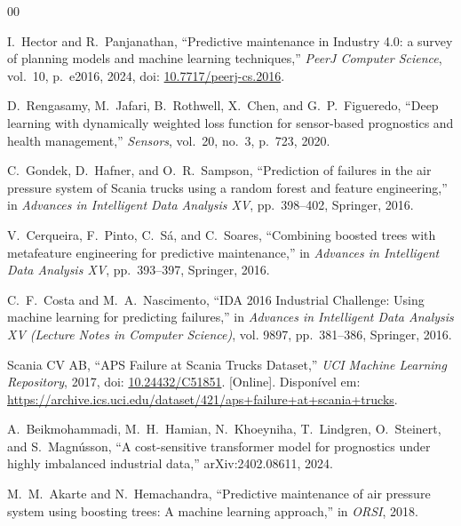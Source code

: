 \documentclass[conference]{IEEEtran}
\begin{document}
\begin{thebibliography}{00}

I.~Hector and R.~Panjanathan, ``Predictive maintenance in Industry 4.0: a survey of planning models and machine learning techniques,'' \emph{PeerJ Computer Science}, vol.~10, p.~e2016, 2024, doi: \href{https://doi.org/10.7717/peerj-cs.2016}{10.7717/peerj-cs.2016}.

D.~Rengasamy, M.~Jafari, B.~Rothwell, X.~Chen, and G.~P.~Figueredo, ``Deep learning with dynamically weighted loss function for sensor-based prognostics and health management,'' \emph{Sensors}, vol.~20, no.~3, p.~723, 2020.

C.~Gondek, D.~Hafner, and O.~R.~Sampson, ``Prediction of failures in the air pressure system of Scania trucks using a random forest and feature engineering,'' in \emph{Advances in Intelligent Data Analysis XV}, pp.~398--402, Springer, 2016.

V.~Cerqueira, F.~Pinto, C.~Sá, and C.~Soares, ``Combining boosted trees with metafeature engineering for predictive maintenance,'' in \emph{Advances in Intelligent Data Analysis XV}, pp.~393--397, Springer, 2016.

C.~F.~Costa and M.~A.~Nascimento, ``IDA 2016 Industrial Challenge: Using machine learning for predicting failures,'' in \emph{Advances in Intelligent Data Analysis XV (Lecture Notes in Computer Science)}, vol. 9897, pp.~381--386, Springer, 2016.

Scania CV AB, ``APS Failure at Scania Trucks Dataset,'' \emph{UCI Machine Learning Repository}, 2017, doi: \href{https://doi.org/10.24432/C51851}{10.24432/C51851}. [Online]. Disponível em: \url{https://archive.ics.uci.edu/dataset/421/aps+failure+at+scania+trucks}.

A.~Beikmohammadi, M.~H.~Hamian, N.~Khoeyniha, T.~Lindgren, O.~Steinert, and S.~Magn\'usson, ``A cost-sensitive transformer model for prognostics under highly imbalanced industrial data,'' arXiv:2402.08611, 2024.

M.~M.~Akarte and N.~Hemachandra, ``Predictive maintenance of air pressure system using boosting trees: A machine learning approach,'' in \emph{ORSI}, 2018.


\end{thebibliography}
\end{document}
